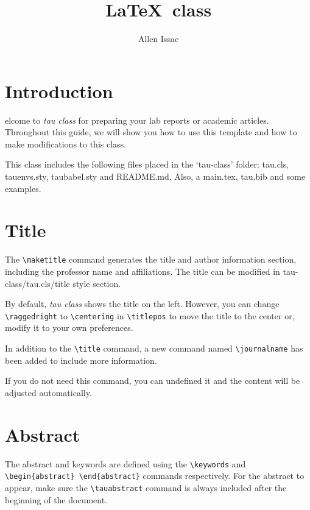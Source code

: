 \documentclass[9pt,a4paper,twoside]{tau-class/tau}
\title{\LaTeX\ class}
\author[a,1]{Allen Issac}
\affil[a]{Affiliation of author one}
\affil[b]{Affiliation of author two}
\affil[c]{Affiliation of author three}
\begin{document}
		
    \maketitle 
    \thispagestyle{firststyle} \tauabstract 
    \tableofcontents
    \linenumbers 
    

\section{Introduction}

    elcome to \textit{tau class} for preparing your lab reports or academic articles. Throughout this guide, we will show you how to use this template and how to make modifications to this class. 
	
    This class includes the following files placed in the ‘tau-class’ folder: tau.cls, tauenvs.sty, taubabel.sty and README.md. Also, a main.tex, tau.bib and some examples. 

\section{Title}

    The \verb*|\maketitle| command generates the title and author information section, including the professor name and affiliations. The title can be modified in tau-class/tau.cls/title style section. 
	
    By default, \textit{tau class} shows the title on the left. However, you can change \verb*|\raggedright| to \verb*|\centering| in \verb*|\titlepos| to move the title to the center or, modify it to your own preferences.
	
    In addition to the \verb|\title| command, a new command named \verb|\journalname| has been added to include more information. 
	
    If you do not need this command, you can undefined it and the content will be adjusted automatically.
	
\section{Abstract}

    The abstract and keywords are defined using the \verb*|\keywords| and \verb*|\begin{abstract} \end{abstract}| commands respectively. For the abstract to appear, make sure the \verb|\tauabstract| command is always included after the beginning of the document.
    
\end{document}
